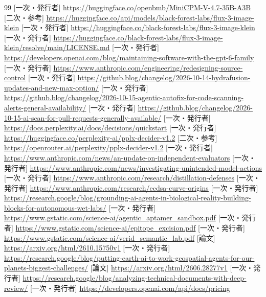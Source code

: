 \documentclass[lualatex,a4paper,10pt]{jlreq}
\begin{document}
\begin{thebibliography}{99}
 [一次・発行者] \url{https://huggingface.co/openbmb/MiniCPM-V-4.7-35B-A3B}
 [二次・参考] \url{https://huggingface.co/api/models/black-forest-labs/flux-3-image-klein}
 [一次・発行者] \url{https://huggingface.co/black-forest-labs/flux-3-image-klein}
 [一次・発行者] \url{https://huggingface.co/black-forest-labs/flux-3-image-klein/resolve/main/LICENSE.md}
 [一次・発行者] \url{https://developers.openai.com/blog/maintaining-software-with-the-gpt-6-family}
 [一次・発行者] \url{https://www.anthropic.com/engineering/redesigning-source-control}
 [一次・発行者] \url{https://github.blog/changelog/2026-10-14-hydrafusion-updates-and-new-max-option/}
 [一次・発行者] \url{https://github.blog/changelog/2026-10-15-agentic-autofix-for-code-scanning-alerts-general-availability/}
 [一次・発行者] \url{https://github.blog/changelog/2026-10-15-ai-scan-for-pull-requests-generally-available/}
 [一次・発行者] \url{https://docs.perplexity.ai/docs/decisions/quickstart}
 [一次・発行者] \url{https://huggingface.co/perplexity-ai/pplx-decider-v1.2}
 [二次・参考] \url{https://openrouter.ai/perplexity/pplx-decider-v1.2}
 [一次・発行者] \url{https://www.anthropic.com/news/an-update-on-independent-evaluators}
 [一次・発行者] \url{https://www.anthropic.com/news/investigating-unintended-model-actions}
 [一次・発行者] \url{https://www.anthropic.com/research/distillation-defenses}
 [一次・発行者] \url{https://www.anthropic.com/research/ecdsa-curve-origins}
 [一次・発行者] \url{https://research.google/blog/grounding-ai-agents-in-biological-reality-building-blocks-for-autonomous-wet-labs/}
 [一次・発行者] \url{https://www.gstatic.com/science-ai/agentic_aptamer_sandbox.pdf}
 [一次・発行者] \url{https://www.gstatic.com/science-ai/epitope_excision.pdf}
 [一次・発行者] \url{https://www.gstatic.com/science-ai/verid_semantic_lab.pdf}
 [論文] \url{https://arxiv.org/html/2610.15750v1}
 [一次・発行者] \url{https://research.google/blog/putting-earth-ai-to-work-geospatial-agents-for-our-planets-biggest-challenges/}
 [論文] \url{https://arxiv.org/html/2606.28277v1}
 [一次・発行者] \url{https://research.google/blog/analyzing-technical-documents-with-deep-review/}
 [一次・発行者] \url{https://developers.openai.com/api/docs/pricing}

\end{thebibliography}
\end{document}
